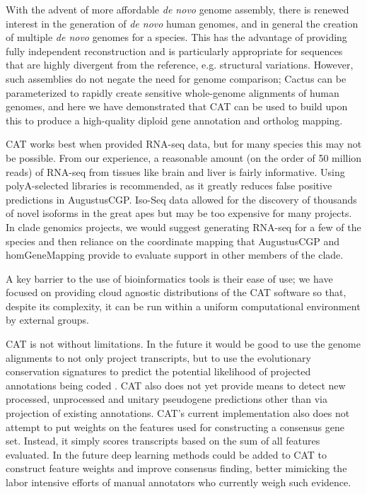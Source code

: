 \documentclass[fleqn,10pt]{wlscirep}
\begin{document}
With the advent of more affordable \textit{de novo} genome assembly, there is renewed interest in the generation of \textit{de novo} human genomes, and in general the creation of multiple \textit{de novo} genomes for a species. This has the advantage of providing fully independent reconstruction and is particularly appropriate for sequences that are highly divergent from the reference, e.g. structural variations. However, such assemblies do not negate the need for genome comparison; Cactus can be parameterized to rapidly create sensitive whole-genome alignments of human genomes, and here we have demonstrated that CAT can be used to build upon this to produce a high-quality diploid gene annotation and ortholog mapping. 

CAT works best when provided RNA-seq data, but for many species this may not be possible. From our experience, a reasonable amount (on the order of 50 million reads) of RNA-seq from tissues like brain and liver is fairly informative. Using polyA-selected libraries is recommended, as it greatly reduces false positive predictions in AugustusCGP. Iso-Seq data allowed for the discovery of thousands of novel isoforms in the great apes but may be too expensive for many projects. In clade genomics projects, we would suggest generating RNA-seq for a few of the species and then reliance on the coordinate mapping that AugustusCGP and homGeneMapping provide to evaluate support in other members of the clade. 

A key barrier to the use of bioinformatics tools is their ease of use; we have focused on providing cloud agnostic distributions of the CAT software so that, despite its complexity, it can be run within a uniform computational environment by external groups. 

CAT is not without limitations. In the future it would be good to use the genome alignments to not only project transcripts, but to use the evolutionary conservation signatures to predict the potential likelihood of projected annotations being coded \cite{lin2011phylocsf}. CAT also does not yet provide means to detect new processed, unprocessed and unitary pseudogene predictions other than via projection of existing annotations. CAT’s current implementation also does not attempt to put weights on the features used for constructing a consensus gene set. Instead, it simply scores transcripts based on the sum of all features evaluated. In the future deep learning methods could be added to CAT to construct feature weights and improve consensus finding, better mimicking the labor intensive efforts of manual annotators who currently weigh such evidence. 
\end{document}
